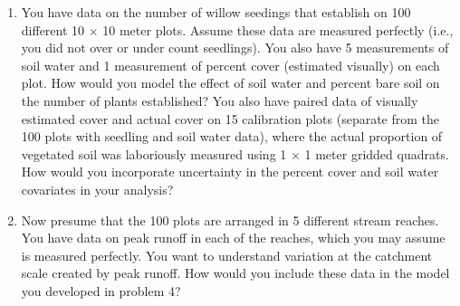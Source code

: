 \documentclass[12pt, oneside]{article}
\begin{document}
\begin{enumerate}[leftmargin=*]
\item You have data on the number of willow seedings that establish on 100 different 10 $\times$ 10 meter plots. Assume these data are measured perfectly (i.e., you did not over or under count seedlings). You also have 5 measurements of soil water and 1 measurement of percent cover (estimated visually) on each plot.  How would you model the effect of soil water and percent bare soil on the number of plants established? You also have paired data of visually estimated cover and actual cover on 15 calibration plots (separate from the 100 plots with seedling and soil water data), where the actual proportion of vegetated soil was laboriously measured using 1 $\times$ 1 meter gridded quadrats.  How would you incorporate uncertainty in the percent cover and soil water covariates in your analysis?

\item Now presume that the 100 plots are arranged in 5 different stream reaches.  You have data on peak runoff in each of the reaches, which you may assume is measured perfectly. You want to understand variation at the catchment scale created by peak runoff.  How would you include these data in the model you developed in problem 4?


\end{enumerate}
\end{document}
